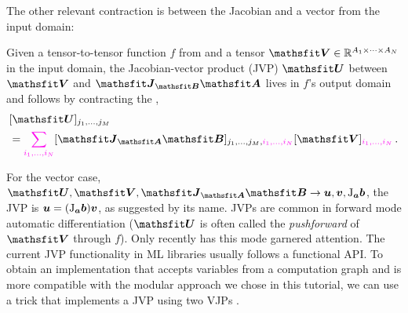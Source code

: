 The other relevant contraction is between the Jacobian and a vector from the input domain:

\begin{definition}\label{def:jvp}
  Given a tensor-to-tensor function $f$ from  and a tensor $\tV \in \sR^{A_1 \times \dots \times A_N}$ in the input domain, the Jacobian-vector product (JVP) $\tU$ between $\tV$ and $\tJ_{\tB}\tA$ lives in $f$'s output domain and follows by contracting the ,
  \begin{align*}
    & [\tU]_{j_1, \dots, j_M}
    \\
    & =
      \colored[VectorPink]{\sum_{i_1, \dots, i_N}}
      [\tJ_{\tA}\tB]_{j_1, \dots, j_M, \colored[VectorPink]{i_1, \dots, i_N}}
      [\tV]_{\colored[VectorPink]{i_1, \dots, i_N}}\,.
  \end{align*}
\end{definition}
For the vector case, $\tU, \tV, \tJ_{\tA}\tB \to \vu, \vv, \jac_{\va}\vb$, the JVP is ${\bm{u}} = (\mathrm{J}_{{\bm{a}}}{\bm{b}}) {\bm{v}}$, as suggested by its name.
JVPs are common in forward mode automatic differentiation ($\tU$ is often called the \emph{pushforward} of $\tV$ through $f$).
Only recently has this mode garnered attention.
The current JVP functionality in ML libraries usually follows a functional API.
To obtain an implementation that accepts variables from a computation graph and is more compatible with the modular approach we chose in this tutorial, we can use a trick that implements a JVP using two VJPs \cite{townsend2017new}.

